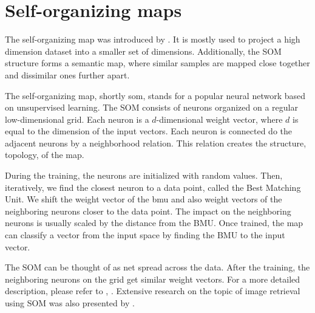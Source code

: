\section{Self-organizing maps}

The self-organizing map was introduced by \cite{kohonen1982self}. It is mostly used to project a high dimension dataset into a smaller set of dimensions. Additionally, the SOM structure forms a semantic map, where similar samples are mapped close together and dissimilar ones further apart.

The self-organizing map, shortly \acrshort{som}, stands for a popular neural network based on unsupervised learning. The SOM consists of neurons organized on a regular low-dimensional grid. Each neuron is a $d$-dimensional weight vector, where $d$ is equal to the dimension of the input vectors. Each neuron is connected do the adjacent neurons by a neighborhood relation. This relation creates the structure, topology, of the map. 

During the training, the neurons are initialized with random values. Then, iteratively, we find the closest neuron to a data point, called the Best Matching Unit. We shift the weight vector of the \acrshort{bmu} and also weight vectors of the neighboring neurons closer to the data point. The impact on the neighboring neurons is usually scaled by the distance from the BMU. Once trained, the map can classify a vector from the input space by finding the BMU to the input vector.

The SOM can be thought of as net spread across the data. After the training, the neighboring neurons on the grid get similar weight vectors. For a more detailed description, please refer to \cite{kohonen1982self}, \cite{kohonen2007kohonen}. Extensive research on the topic of image retrieval using SOM was also presented by \cite{koskela2003interactive}.